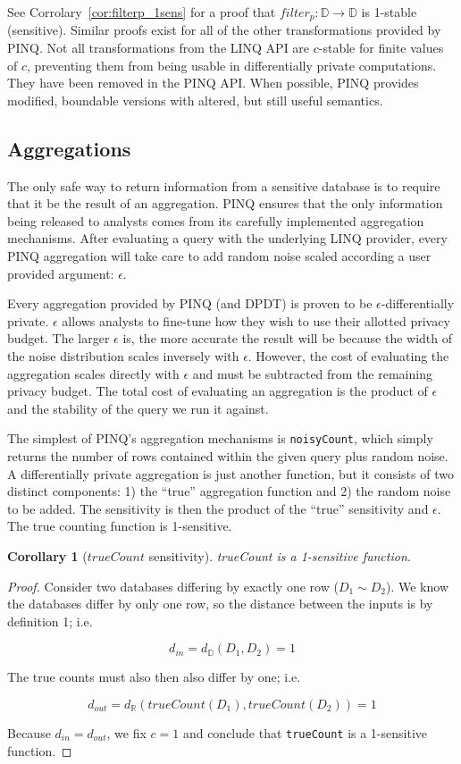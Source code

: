 \documentclass[12pt]{report}
\newtheorem{cor}[defn]{Corollary}
\begin{document}
See Corrolary~\ref{cor:filterp_1sens} for a proof that $filter_p : \mathbb D \rightarrow \mathbb D$ is 1-stable (sensitive).
Similar proofs exist for all of the other transformations provided by PINQ\cite{conf/sigmod/McSherry09}.
Not all transformations from the LINQ API are $c$-stable for finite values of $c$, preventing them from being usable in differentially private computations.
They have been removed in the PINQ API.
When possible, PINQ provides modified, boundable versions with altered, but still useful semantics.

\subsection{Aggregations}

The only safe way to return information from a sensitive database is to require that it be the result of an aggregation.
PINQ ensures that the only information being released to analysts comes from its carefully implemented aggregation mechanisms.
After evaluating a query with the underlying LINQ provider, every PINQ aggregation will take care to add random noise scaled according a user provided argument: $\epsilon$.

Every aggregation provided by PINQ (and DPDT) is proven to be $\epsilon$-differentially private.
$\epsilon$ allows analysts to fine-tune how they wish to use their allotted privacy budget.
The larger $\epsilon$ is, the more accurate the result will be because the width of the noise distribution scales inversely with $\epsilon$.
However, the cost of evaluating the aggregation scales directly with $\epsilon$ and must be subtracted from the remaining privacy budget.
The total cost of evaluating an aggregation is the product of $\epsilon$ and the stability of the query we run it against.

The simplest of PINQ's aggregation mechanisms is \texttt{noisyCount}, which simply returns the number of rows contained within the given query plus random noise.
A differentially private aggregation is just another function, but it consists of two distinct components: 1) the ``true'' aggregation function and 2) the random noise to be added.
The sensitivity is then the product of the ``true'' sensitivity and $\epsilon$.
The true counting function is 1-sensitive.

\begin{cor}[$trueCount$ sensitivity]
trueCount is a 1-sensitive function.
\end{cor}
\begin{proof}
Consider two databases differing by exactly one row ($D_1 \sim D_2$).
We know the databases differ by only one row, so the distance between the inputs is by definition 1; i.e.

$$d_{in} = d_{\mathbb D}(D_1,D_2)=1$$

The true counts must also then also differ by one; i.e.

$$d_{out} = d_{\mathbb R}(trueCount(D_1),trueCount(D_2))=1$$

Because $d_{in} = d_{out}$, we fix $c=1$ and conclude that \texttt{trueCount} is a 1-sensitive function.
\end{proof}
\end{document}
